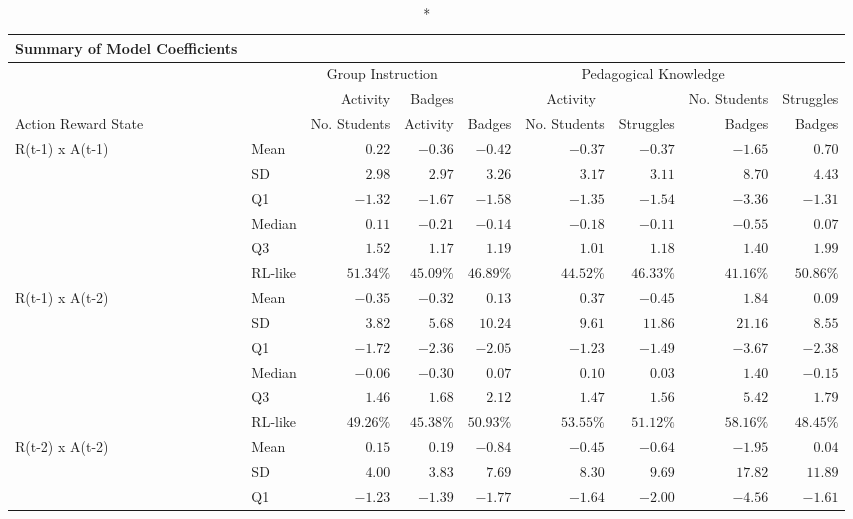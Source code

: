 \documentclass[
  number,
  preprint,
  3p,
  onecolumn]{elsarticle}
\begin{document}
\begin{longtable}{l|l|rrrrrrr}
\caption*{
{\large Summary of Model Coefficients}
} \\ 
\toprule
\multicolumn{2}{l}{} & \multicolumn{2}{c}{Group Instruction} & \multicolumn{5}{c}{Pedagogical Knowledge} \\ 
\cmidrule(lr){3-4} \cmidrule(lr){5-9}
\multicolumn{2}{l}{} & Activity & Badges & \multicolumn{3}{c}{Activity} & No. Students & Struggles \\ 
\cmidrule(lr){3-3} \cmidrule(lr){4-4} \cmidrule(lr){5-7} \cmidrule(lr){8-8} \cmidrule(lr){9-9}
\multicolumn{2}{l}{Action 
 Reward 
 State} & No. Students & Activity & Badges & No. Students & Struggles & Badges & Badges \\ 
\midrule\addlinespace[2.5pt]
R(t-1) x 
 A(t-1) & Mean & $0.22$ & $-0.36$ & $-0.42$ & $-0.37$ & $-0.37$ & $-1.65$ & $0.70$ \\ 
 & SD & $2.98$ & $2.97$ & $3.26$ & $3.17$ & $3.11$ & $8.70$ & $4.43$ \\ 
 & Q1 & $-1.32$ & $-1.67$ & $-1.58$ & $-1.35$ & $-1.54$ & $-3.36$ & $-1.31$ \\ 
 & Median & $0.11$ & $-0.21$ & $-0.14$ & $-0.18$ & $-0.11$ & $-0.55$ & $0.07$ \\ 
 & Q3 & $1.52$ & $1.17$ & $1.19$ & $1.01$ & $1.18$ & $1.40$ & $1.99$ \\ 
 & RL-like & $51.34\%$ & $45.09\%$ & $46.89\%$ & $44.52\%$ & $46.33\%$ & $41.16\%$ & $50.86\%$ \\ 
\midrule\addlinespace[2.5pt]
R(t-1) x 
 A(t-2) & Mean & $-0.35$ & $-0.32$ & $0.13$ & $0.37$ & $-0.45$ & $1.84$ & $0.09$ \\ 
 & SD & $3.82$ & $5.68$ & $10.24$ & $9.61$ & $11.86$ & $21.16$ & $8.55$ \\ 
 & Q1 & $-1.72$ & $-2.36$ & $-2.05$ & $-1.23$ & $-1.49$ & $-3.67$ & $-2.38$ \\ 
 & Median & $-0.06$ & $-0.30$ & $0.07$ & $0.10$ & $0.03$ & $1.40$ & $-0.15$ \\ 
 & Q3 & $1.46$ & $1.68$ & $2.12$ & $1.47$ & $1.56$ & $5.42$ & $1.79$ \\ 
 & RL-like & $49.26\%$ & $45.38\%$ & $50.93\%$ & $53.55\%$ & $51.12\%$ & $58.16\%$ & $48.45\%$ \\ 
\midrule\addlinespace[2.5pt]
R(t-2) x 
 A(t-2) & Mean & $0.15$ & $0.19$ & $-0.84$ & $-0.45$ & $-0.64$ & $-1.95$ & $0.04$ \\ 
 & SD & $4.00$ & $3.83$ & $7.69$ & $8.30$ & $9.69$ & $17.82$ & $11.89$ \\ 
 & Q1 & $-1.23$ & $-1.39$ & $-1.77$ & $-1.64$ & $-2.00$ & $-4.56$ & $-1.61$ \\ 

\end{longtable}
\end{document}
